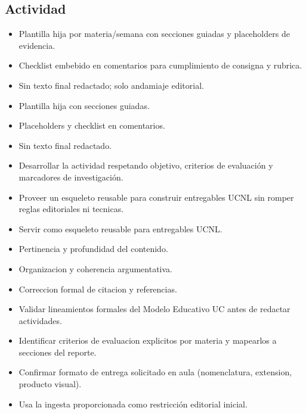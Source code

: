 \documentclass[12pt]{article}
\begin{document}
\subsection*{Actividad}
\begin{itemize}[leftmargin=*]
  \item Plantilla hija por materia/semana con secciones guiadas y placeholders de evidencia.
  \item Checklist embebido en comentarios para cumplimiento de consigna y rubrica.
  \item Sin texto final redactado; solo andamiaje editorial.
  \item Plantilla hija con secciones guiadas.
  \item Placeholders y checklist en comentarios.
  \item Sin texto final redactado.
  \item Desarrollar la actividad respetando objetivo, criterios de evaluación y marcadores de investigación.
  \item Proveer un esqueleto reusable para construir entregables UCNL sin romper reglas editoriales ni tecnicas.
  \item Servir como esqueleto reusable para entregables UCNL.
  \item Pertinencia y profundidad del contenido.
  \item Organizacion y coherencia argumentativa.
  \item Correccion formal de citacion y referencias.
  \item Validar lineamientos formales del Modelo Educativo UC antes de redactar actividades.
  \item Identificar criterios de evaluacion explicitos por materia y mapearlos a secciones del reporte.
  \item Confirmar formato de entrega solicitado en aula (nomenclatura, extension, producto visual).
  \item Usa la ingesta proporcionada como restricción editorial inicial.
\end{itemize}
\end{document}
